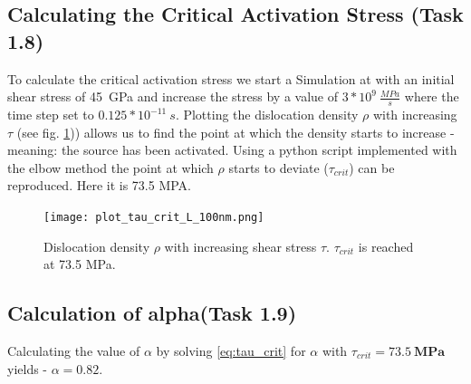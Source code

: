 \subsection{Calculating the Critical Activation Stress (Task 1.8)}
To calculate the critical activation stress we start a Simulation at with an initial shear stress of 45~GPa and increase the stress by a value of \(3*10^{9}~\frac{MPa}{s}\) where the time step set to \(0.125*10^{-11}~s\). Plotting the dislocation density \(\rho\) with increasing \(\tau\) (see fig. \ref{fig:tau_vs_rho})) allows us to find the point at which the density starts to increase - meaning: the source has been activated. Using a python script implemented with the elbow method the point at which \(\rho\) starts to deviate (\(\tau_{crit}\)) can be reproduced. Here it is 73.5 MPA.

\begin{figure}[htb]
	\centering
	\texttt{[image: plot\_tau\_crit\_L\_100nm.png]}
	\caption{Dislocation density \(\rho\) with increasing shear stress \(\tau\). \(\tau_{crit}\) is reached at 73.5 MPa. }
	\label{fig:tau_vs_rho}	
\end{figure}

\subsection{Calculation of alpha(Task 1.9)}

Calculating the value of \(\alpha\) by solving \ref{eq:tau_crit} for \(\alpha \) with \(\tau_{crit}=73.5~\mathbf{MPa} \) yields - \(\alpha = 0.82\).

\printbibliography


